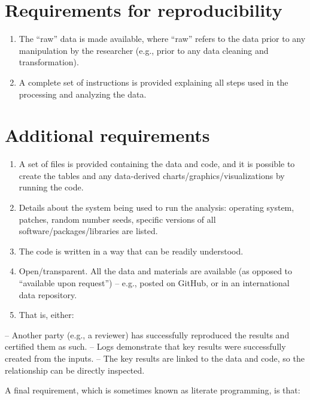 \documentclass[
]{book}
\providecommand{\tightlist}{%
  \setlength{\itemsep}{0pt}\setlength{\parskip}{0pt}}
\begin{document}
\hypertarget{requirements-for-reproducibility}{%
\section{Requirements for reproducibility}\label{requirements-for-reproducibility}}

\begin{enumerate}
\def\labelenumi{\arabic{enumi})}
\tightlist
\item
  The ``raw'' data is made available, where ``raw'' refers to the data prior to any manipulation by the researcher (e.g., prior to any data cleaning and transformation).
\item
  A complete set of instructions is provided explaining all steps used in the processing and analyzing the data.
\end{enumerate}

\hypertarget{additional-requirements}{%
\section{Additional requirements}\label{additional-requirements}}

\begin{enumerate}
\def\labelenumi{\alph{enumi})}
\item
  A set of files is provided containing the data and code, and it is possible to create the tables and any data-derived charts/graphics/visualizations by running the code.
\item
  Details about the system being used to run the analysis: operating system, patches, random number seeds, specific versions of all software/packages/libraries are listed.
\item
  The code is written in a way that can be readily understood.
\item
  Open/transparent. All the data and materials are available (as opposed to ``available upon request'') -- e.g., posted on GitHub, or in an international data repository.
\item
  That is, either:
\end{enumerate}

-- Another party (e.g., a reviewer) has successfully reproduced the results and certified them as such.
-- Logs demonstrate that key results were successfully created from the inputs.
-- The key results are linked to the data and code, so the relationship can be directly inspected.

A final requirement, which is sometimes known as literate programming, is that:
\end{document}
